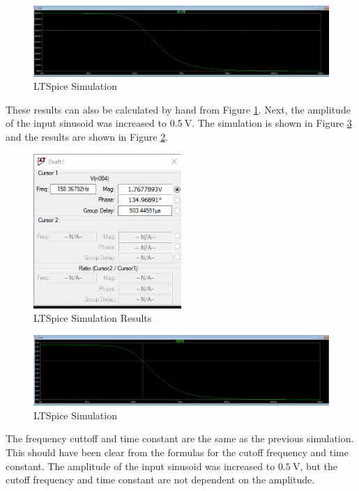 \documentclass[12pt]{article}
\begin{document}
\begin{figure}[H]
  \centering
  \includegraphics[width=1\textwidth]{Lab 10 Shared/1.2 simulation.PNG}
  \caption{LTSpice Simulation}
  \label{fig:1.2Simulation}
\end{figure}
These results can also be calculated by hand from Figure \ref{fig:1.2Simulation}.
Next, the amplitude of the input sinusoid was increased to $\SI{0.5}{\volt}$.
The simulation is shown in Figure \ref{fig:1.3Simulation} and
the results are shown in Figure \ref{fig:1.3Results}.
\begin{figure}[H]
  \centering
  \includegraphics[width=0.5\textwidth]{Lab 10 Shared/1.3 simulation results.PNG}
  \caption{LTSpice Simulation Results}
  \label{fig:1.3Results}
\end{figure}

\begin{figure}[H]
  \centering
  \includegraphics[width=1\textwidth]{Lab 10 Shared/1.3 simulation.PNG}
  \caption{LTSpice Simulation}
  \label{fig:1.3Simulation}
\end{figure}

The frequency cuttoff and time constant are the same as
the previous simulation. This should have been clear from the
formulas for the cutoff frequency and time constant. The amplitude
of the input sinusoid was increased to $\SI{0.5}{\volt}$, but the
cutoff frequency and time constant are not dependent on the amplitude.
\newline
\end{document}
